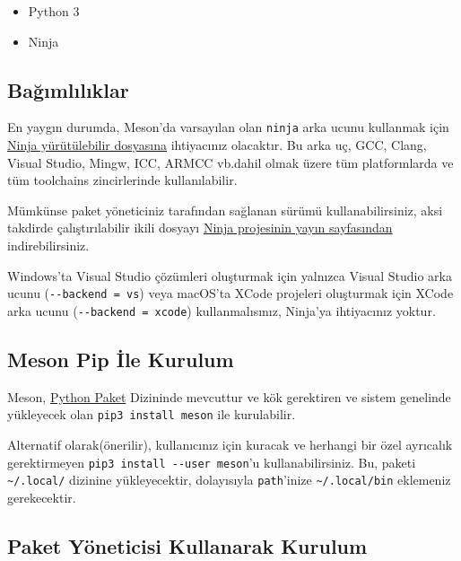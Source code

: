 \documentclass[
]{book}
\providecommand{\tightlist}{%
  \setlength{\itemsep}{0pt}\setlength{\parskip}{0pt}}
\begin{document}
\begin{itemize}
\tightlist
\item
  Python 3
\item
  Ninja
\end{itemize}

\hypertarget{baux11fux131mlux131lux131klar}{%
\subsection{Bağımlılıklar}\label{baux11fux131mlux131lux131klar}}

En yaygın durumda, Meson'da varsayılan olan \texttt{ninja} arka ucunu kullanmak için \href{https://ninja-build.org/}{Ninja yürütülebilir dosyasına} ihtiyacınız olacaktır. Bu arka uç, GCC, Clang, Visual Studio, Mingw, ICC, ARMCC vb.dahil olmak üzere tüm platformlarda ve tüm toolchains zincirlerinde kullanılabilir.

Mümkünse paket yöneticiniz tarafından sağlanan sürümü kullanabilirsiniz, aksi takdirde çalıştırılabilir ikili dosyayı \href{https://github.com/ninja-build/ninja/releases}{Ninja projesinin yayın sayfasından} indirebilirsiniz.

Windows'ta Visual Studio çözümleri oluşturmak için yalnızca Visual Studio arka ucunu (\texttt{-\/-backend\ =\ vs}) veya macOS'ta XCode projeleri oluşturmak için XCode arka ucunu (\texttt{-\/-backend\ =\ xcode}) kullanmalısınız, Ninja'ya ihtiyacınız yoktur.

\hypertarget{meson-pip-ile-kurulum}{%
\subsection{Meson Pip İle Kurulum}\label{meson-pip-ile-kurulum}}

Meson, \href{https://pypi.org/project/meson/}{Python Paket} Dizininde mevcuttur ve kök gerektiren ve sistem genelinde yükleyecek olan \texttt{pip3\ install\ meson} ile kurulabilir.

Alternatif olarak(önerilir), kullanıcınız için kuracak ve herhangi bir özel ayrıcalık gerektirmeyen \texttt{pip3\ install\ -\/-user\ meson}'u kullanabilirsiniz. Bu, paketi \texttt{\textasciitilde{}/.local/} dizinine yükleyecektir, dolayısıyla \texttt{path}'inize \texttt{\textasciitilde{}/.local/bin} eklemeniz gerekecektir.

\hypertarget{paket-yuxf6neticisi-kullanarak-kurulum}{%
\subsection{Paket Yöneticisi Kullanarak Kurulum}\label{paket-yuxf6neticisi-kullanarak-kurulum}}
\end{document}
